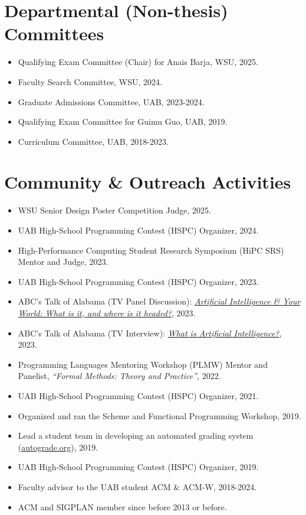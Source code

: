 \documentclass[line]{res}
\begin{document}
\begin{resume}
\section{\large Departmental (Non-thesis) Committees} \vspace{0.45cm}
\begin{itemize}
  \item Qualifying Exam Committee (Chair) for Anais Barja, WSU, 2025.
  \item Faculty Search Committee, WSU, 2024.
  \item Graduate Admissions Committee, UAB, 2023-2024.
  \item Qualifying Exam Committee for Guimu Guo, UAB, 2019.
  \item Curriculum Committee, UAB, 2018-2023.
\end{itemize}

\section{\large Community \& Outreach Activities} \vspace{0.45cm}
\begin{itemize}
  \item WSU Senior Design Poster Competition Judge, 2025.
  \item UAB High-School Programming Contest (HSPC) Organizer, 2024.
  \item High-Performance Computing Student Research Symposium (HiPC SRS) Mentor and Judge, 2023.
  \item UAB High-School Programming Contest (HSPC) Organizer, 2023.
  \item ABC's Talk of Alabama (TV Panel Discussion): \href{https://tinyurl.com/abc-talk-of-alabama-gilray}{\emph{Artificial Intelligence \& Your World: What is it, and where is it headed?}}, 2023.
  \item ABC's Talk of Alabama (TV Interview): \href{https://tinyurl.com/abc-talk-of-alabama-gilray}{\emph{What is Artificial Intelligence?}}, 2023.
  \item Programming Languages Mentoring Workshop (PLMW) Mentor and Panelist, \emph{``Formal Methods: Theory and Practice''}, 2022.
  \item UAB High-School Programming Contest (HSPC) Organizer, 2021.
  \item Organized and ran the Scheme and Functional Programming Workshop, 2019.
  \item Lead a student team in developing an automated grading system (\href{https://autograde.org}{autograde.org}), 2019.
  \item UAB High-School Programming Contest (HSPC) Organizer, 2019.  
  \item Faculty advisor to the UAB student ACM \& ACM-W, 2018-2024.
  \item ACM and SIGPLAN member since before 2013 or before.
\end{itemize}


\end{resume}
\end{document}
